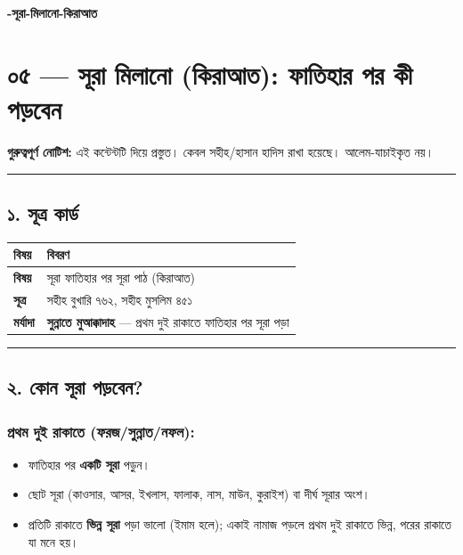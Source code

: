 

\begin{center}{\Large\bfseries\color{emerald} -সূরা-মিলানো-কিরাআত}\end{center}
\vspace{1em}
\section*{০৫ — সূরা মিলানো (কিরাআত): ফাতিহার পর কী পড়বেন}

\begin{warnbox}
 \textbf{গুরুত্বপূর্ণ নোটিশ:} এই কন্টেন্টটি  দিয়ে প্রস্তুত। কেবল সহীহ/হাসান হাদিস রাখা হয়েছে। আলেম-যাচাইকৃত নয়।
\end{warnbox}

\medskip\hrule\medskip

\subsection*{১. সূত্র কার্ড}

\begin{table}[h]\centering\small
\begin{tabular}{ll}
বিষয় & বিবরণ \\
\hline
\textbf{বিষয়} & সূরা ফাতিহার পর সূরা পাঠ (কিরাআত) \\
\textbf{সূত্র} & সহীহ বুখারি ৭৬২, সহীহ মুসলিম ৪৫১ \\
\textbf{মর্যাদা} & \textbf{সুন্নাতে মুআক্কাদাহ} — প্রথম দুই রাকাতে ফাতিহার পর সূরা পড়া \\
\hline
\end{tabular}
\end{table}

\medskip\hrule\medskip

\subsection*{২. কোন সূরা পড়বেন?}

\subsubsection*{\textbf{প্রথম দুই রাকাতে (ফরজ/সুন্নাত/নফল):}}
\begin{itemize}
\item ফাতিহার পর \textbf{একটি সূরা} পড়ুন।
\item ছোট সূরা (কাওসার, আসর, ইখলাস, ফালাক, নাস, মাউন, কুরাইশ) বা দীর্ঘ সূরার অংশ।
\item প্রতিটি রাকাতে \textbf{ভিন্ন সূরা} পড়া ভালো (ইমাম হলে); একাই নামাজ পড়লে প্রথম দুই রাকাতে ভিন্ন, পরের রাকাতে যা মনে হয়।
\end{itemize}
